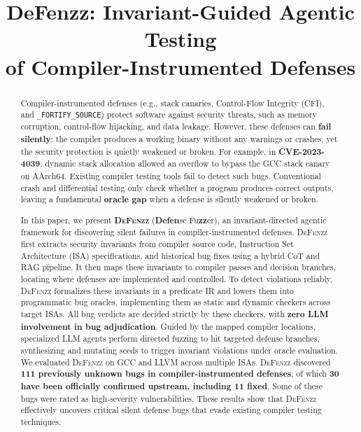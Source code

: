 \documentclass[conference]{IEEEtran}
\begin{document}
\title{DeFenzz: Invariant-Guided Agentic Testing\\of Compiler-Instrumented Defenses}

\author{\IEEEauthorblockN{\mbox{}}\IEEEauthorblockA{\mbox{}}}

\maketitle
\thispagestyle{plain}
\pagestyle{plain}

\begin{abstract}
Compiler-instrumented defenses (e.g., stack canaries, Control-Flow Integrity (CFI), and \texttt{\_FORTIFY\_SOURCE}) protect software against security threats, such as memory corruption, control-flow hijacking, and data leakage. However, these defenses can \textbf{fail silently}: the compiler produces a working binary without any warnings or crashes, yet the security protection is quietly weakened or broken. For example, in \textbf{CVE-2023-4039}, dynamic stack allocation allowed an overflow to bypass the GCC stack canary on AArch64. Existing compiler testing tools fail to detect such bugs. Conventional crash and differential testing only check whether a program produces correct outputs, leaving a fundamental \textbf{oracle gap} when a defense is silently weakened or broken.

In this paper, we present \textbf{\textsc{DeFenzz}} (\textbf{Defen}se Fu\textbf{zz}er), an invariant-directed agentic framework for discovering silent failures in compiler-instrumented defenses. \textsc{DeFenzz} first extracts security invariants from compiler source code, Instruction Set Architecture (ISA) specifications, and historical bug fixes using a hybrid CoT and RAG pipeline. It then maps these invariants to compiler passes and decision branches, locating where defenses are implemented and controlled. To detect violations reliably, \textsc{DeFenzz} formalizes these invariants in a predicate IR and lowers them into programmatic bug oracles, implementing them as static and dynamic checkers across target ISAs. All bug verdicts are decided strictly by these checkers, with \textbf{zero LLM involvement in bug adjudication}. Guided by the mapped compiler locations, specialized LLM agents perform directed fuzzing to hit targeted defense branches, synthesizing and mutating seeds to trigger invariant violations under oracle evaluation. We evaluated \textsc{DeFenzz} on GCC and LLVM across multiple ISAs. \textsc{DeFenzz} discovered \textbf{111 previously unknown bugs in compiler-instrumented defenses}, of which \textbf{30 have been officially confirmed upstream, including 11 fixed}. Some of these bugs were rated as high-severity vulnerabilities. These results show that \textsc{DeFenzz} effectively uncovers critical silent defense bugs that evade existing compiler testing techniques.
\end{abstract}
\end{document}
